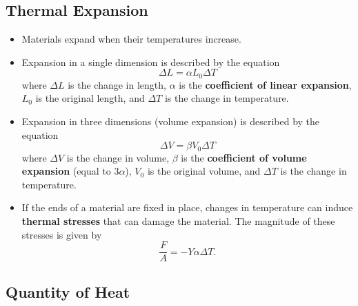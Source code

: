 \documentclass{article}
\begin{document}
\subsection{Thermal Expansion}

\begin{itemize}
  \item Materials expand when their temperatures increase.

  \item Expansion in a single dimension is described by the equation \[\Delta L = \alpha L_0 \Delta T\] where $\Delta L$ is the change in length, $\alpha$ is the \textbf{coefficient of linear expansion}, $L_0$ is the original length, and $\Delta T$ is the change in temperature.

  \item Expansion in three dimensions (volume expansion) is described by the equation \[\Delta V = \beta V_0 \Delta T\] where $\Delta V$ is the change in volume, $\beta$ is the \textbf{coefficient of volume expansion} (equal to $3 \alpha$), $V_0$ is the original volume, and $\Delta T$ is the change in temperature.

  \item If the ends of a material are fixed in place, changes in temperature can induce \textbf{thermal stresses} that can damage the material. The magnitude of these stresses is given by \[\frac{F}{A} = -Y \alpha \Delta T.\]
\end{itemize}

\subsection{Quantity of Heat}
\end{document}
